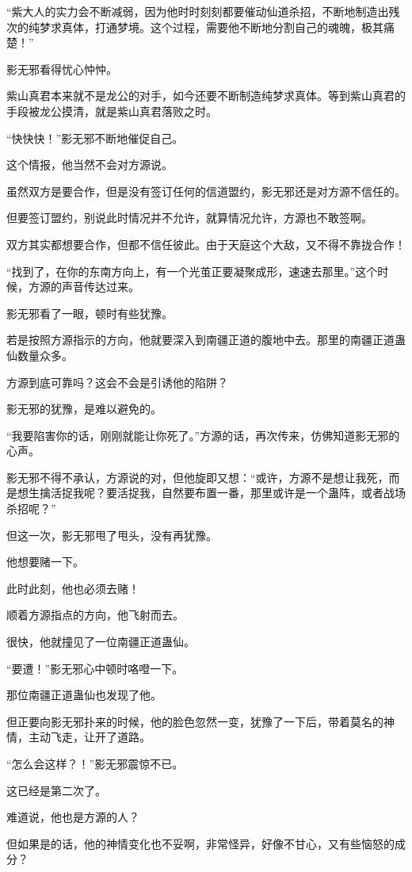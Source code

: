 \begin{this_body}
“紫大人的实力会不断减弱，因为他时时刻刻都要催动仙道杀招，不断地制造出残次的纯梦求真体，打通梦境。这个过程，需要他不断地分割自己的魂魄，极其痛楚！”

影无邪看得忧心忡忡。

紫山真君本来就不是龙公的对手，如今还要不断制造纯梦求真体。等到紫山真君的手段被龙公摸清，就是紫山真君落败之时。

“快快快！”影无邪不断地催促自己。

这个情报，他当然不会对方源说。

虽然双方是要合作，但是没有签订任何的信道盟约，影无邪还是对方源不信任的。

但要签订盟约，别说此时情况并不允许，就算情况允许，方源也不敢签啊。

双方其实都想要合作，但都不信任彼此。由于天庭这个大敌，又不得不靠拢合作！

“找到了，在你的东南方向上，有一个光茧正要凝聚成形，速速去那里。”这个时候，方源的声音传达过来。

影无邪看了一眼，顿时有些犹豫。

若是按照方源指示的方向，他就要深入到南疆正道的腹地中去。那里的南疆正道蛊仙数量众多。

方源到底可靠吗？这会不会是引诱他的陷阱？

影无邪的犹豫，是难以避免的。

“我要陷害你的话，刚刚就能让你死了。”方源的话，再次传来，仿佛知道影无邪的心声。

影无邪不得不承认，方源说的对，但他旋即又想：“或许，方源不是想让我死，而是想生擒活捉我呢？要活捉我，自然要布置一番，那里或许是一个蛊阵，或者战场杀招呢？”

但这一次，影无邪甩了甩头，没有再犹豫。

他想要赌一下。

此时此刻，他也必须去赌！

顺着方源指点的方向，他飞射而去。

很快，他就撞见了一位南疆正道蛊仙。

“要遭！”影无邪心中顿时咯噔一下。

那位南疆正道蛊仙也发现了他。

但正要向影无邪扑来的时候，他的脸色忽然一变，犹豫了一下后，带着莫名的神情，主动飞走，让开了道路。

“怎么会这样？！”影无邪震惊不已。

这已经是第二次了。

难道说，他也是方源的人？

但如果是的话，他的神情变化也不妥啊，非常怪异，好像不甘心，又有些恼怒的成分？


\end{this_body}
